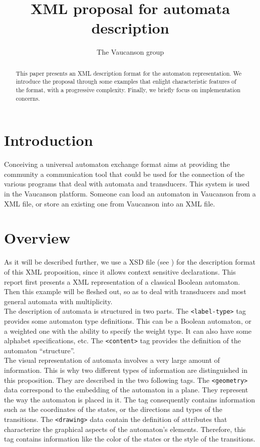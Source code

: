 \documentclass[a4paper]{article}
\newcommand{\Vauc}{{\sc Vaucanson}\xspace}
\def\typetag{\texttt{<label-type>}}
\def\contenttag{\texttt{<content>}}
\def\geometrytag{\texttt{<geometry>}}
\def\drawingtag{\texttt{<drawing>}}
\begin{document}
\title{XML proposal for automata description}

\author{The \Vauc group}

\maketitle{}

\begin{abstract}
This paper presents an XML description format for the automaton
representation. We introduce the proposal through some examples that
enlight characteristic features of the format, with a progressive
complexity. Finally, we briefly focus on implementation concerns.
\end{abstract}

\section*{Introduction}

Conceiving a universal automaton exchange format aims at
providing the community a communication tool that could be used
for the connection of the various programs that deal with
automata and transducers.
This system is used in the Vaucanson platform. Someone can load an automaton in
Vaucanson from a XML file, or store an existing one from Vaucanson into an XML file.

\section{Overview}

As it will be described further, we use a XSD file (see \cite{XSD}) for the description
format of this XML proposition, since it allows context sensitive declarations.
This report first presents a XML representation of a classical Boolean
automaton. Then this example will be fleshed out, so as to deal with transducers
and most general automata with multiplicity.\\

The description of automata is structured in two parts.  The
\typetag{} tag provides some automaton type definitions. This can be a Boolean
automaton, or a weighted one with the ability to specify the weight type.
It can also have some alphabet specifications, etc. The \contenttag{} tag provides
the definition of the automaton ``structure''.\\

The visual representation of automata involves a very large amount of
information. This is why two different types of information are
distinguished in this proposition. They are described in the two following tags.
 The \geometrytag{} data correspond to the embedding
of the automaton in a plane. They represent the way the automaton is placed in
it. The tag consequently contains information such as the coordinates of the
states, or the directions and types of the transitions. The \drawingtag{} data
contain the definition of attributes that characterize the graphical aspects of the
automaton's elements. Therefore, this tag contains information like the color of the
states or the style of the transitions. \\
\end{document}
